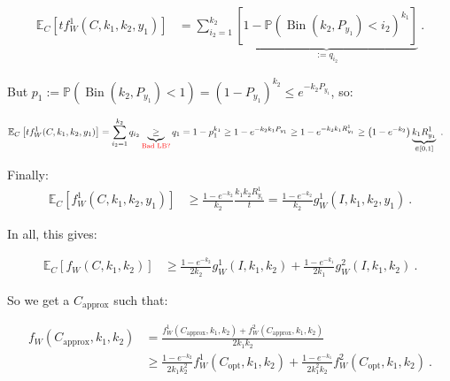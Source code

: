 \documentclass[11pt]{article}
\theoremstyle{definition}
\theoremstyle{remark}
\DeclareMathOperator{\Bin}{\text{Bin}}
\begin{document}
\begin{equation}
  \begin{aligned}
    \mathbb{E}_C\left[tf_W^1(C,k_1,k_2,y_1)\right] &= \sum_{i_2 = 1}^{k_2}\underbrace{\left[1 - \mathbb{P}\left(\Bin\left(k_2,P_{y_1}\right) < i_2 \right)^{k_1}\right]}_{:=q_{i_2}} \ .
  \end{aligned}
\end{equation}

But $p_1 := \mathbb{P}\left(\Bin\left(k_2,P_{y_1}\right) < 1 \right) = (1-P_{y_1})^{k_2} \leq e^{-k_2P_{y_1}}$, so:

\begin{equation}
  \begin{aligned}
    \mathbb{E}_C\left[tf_W^1(C,k_1,k_2,y_1)\right] &= \sum_{i_2 = 1}^{k_2} q_{i_2} \underbrace{\geq}_{\color{red}{\text{Bad LB?}}} q_1 = 1-p_1^{k_1} \geq 1 - e^{-k_2k_1P_{y_1}} \geq 1 - e^{-k_2k_1R^1_{y_1}} \geq \left(1 - e^{-k_2}\right)\underbrace{k_1R^1_{y_1}}_{\in [0,1]}\ .
  \end{aligned}
\end{equation}

Finally:
\begin{equation}
  \begin{aligned}
    \mathbb{E}_C\left[f_W^1(C,k_1,k_2,y_1)\right] &\geq \frac{1 - e^{-k_2}}{k_2}\frac{k_1k_2R^1_{y_1}}{t} = \frac{1 - e^{-k_2}}{k_2} g_W^1(I,k_1,k_2,y_1) \ .
  \end{aligned}
\end{equation}

In all, this gives:

\begin{equation}
  \begin{aligned}
    \mathbb{E}_C\left[f_W(C,k_1,k_2)\right] &\geq \frac{1 - e^{-k_2}}{2k_2} g_W^1(I,k_1,k_2) +  \frac{1 - e^{-k_1}}{2k_1} g_W^2(I,k_1,k_2)  \ .
  \end{aligned}
\end{equation}

So we get a $C_\text{approx}$ such that:

\begin{equation}
  \begin{aligned}
    f_W(C_\text{approx},k_1,k_2) &= \frac{f_W^1(C_\text{approx},k_1,k_2) + f_W^2(C_\text{approx},k_1,k_2)}{2k_1k_2}\\
    &\geq \frac{1 - e^{-k_2}}{2k_1k_2^2} f_W^1(C_\text{opt},k_1,k_2) +  \frac{1 - e^{-k_1}}{2k_1^2k_2} f_W^2(C_\text{opt},k_1,k_2)  \ .
  \end{aligned}
\end{equation}
\end{document}
